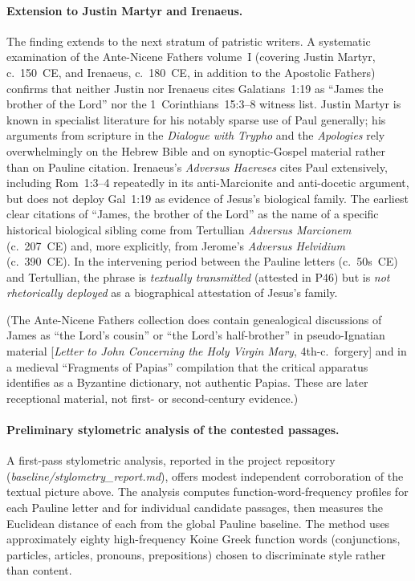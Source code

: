 \documentclass[12pt,oneside]{article}
\begin{document}
\paragraph{Extension to Justin Martyr and Irenaeus.}
The finding extends to the next stratum of patristic writers.
A systematic examination of the Ante-Nicene Fathers volume~I
(covering Justin Martyr, c.~150~CE, and Irenaeus, c.~180~CE, in
addition to the Apostolic Fathers) confirms that neither Justin
nor Irenaeus cites Galatians~1:19 as \enquote{James the brother
of the Lord} nor the 1~Corinthians~15:3--8 witness list.  Justin
Martyr is known in specialist literature for his notably sparse
use of Paul generally; his arguments from scripture in the
\textit{Dialogue with Trypho} and the \textit{Apologies} rely
overwhelmingly on the Hebrew Bible and on synoptic-Gospel material
rather than on Pauline citation.  Irenaeus's \textit{Adversus
Haereses} cites Paul extensively, including Rom~1:3--4
repeatedly in its anti-Marcionite and anti-docetic argument, but
does not deploy Gal~1:19 as evidence of Jesus's biological
family.  The earliest clear citations of \enquote{James, the
brother of the Lord} as the name of a specific historical
biological sibling come from Tertullian \textit{Adversus
Marcionem} (c.~207~CE) and, more explicitly, from Jerome's
\textit{Adversus Helvidium} (c.~390~CE).  In the intervening
period between the Pauline letters (c.~50s~CE) and Tertullian,
the phrase is \textit{textually transmitted} (attested in P46) but
is \textit{not rhetorically deployed} as a biographical attestation
of Jesus's family.

(The Ante-Nicene Fathers collection does contain genealogical
discussions of James as \enquote{the Lord's cousin} or \enquote{the
Lord's half-brother} in pseudo-Ignatian material
[\textit{Letter to John Concerning the Holy Virgin Mary},
4th-c.\ forgery] and in a medieval \enquote{Fragments of Papias}
compilation that the critical apparatus identifies as a
Byzantine dictionary, not authentic Papias.  These are later
receptional material, not first- or second-century evidence.)

\paragraph{Preliminary stylometric analysis of the contested
passages.}
A first-pass stylometric analysis, reported in the project
repository (\textit{baseline/stylometry\_report.md}), offers modest
independent corroboration of the textual picture above.  The
analysis computes function-word-frequency profiles for each
Pauline letter and for individual candidate passages, then
measures the Euclidean distance of each from the global Pauline
baseline.  The method uses approximately eighty high-frequency
Koine Greek function words (conjunctions, particles, articles,
pronouns, prepositions) chosen to discriminate style rather than
content.
\end{document}
